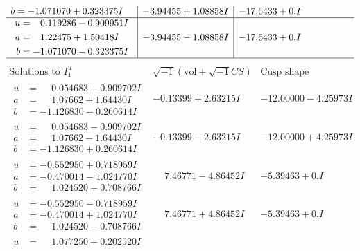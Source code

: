\documentclass[1p]{elsarticle_modified}
\theoremstyle{definition}
\newcommand{\I}{\sqrt{-1}}
\begin{document}
$$\begin{array}{c|c|c}
\begin{aligned}
b &= -1.071070 + 0.323375 I\end{aligned}
 & -3.94455 + 1.08858 I & -17.6433 + 0. I\phantom{ +0.000000I} \\ \hline\begin{aligned}
u &= \phantom{-}0.119286 - 0.909951 I \\
a &= \phantom{-}1.22475 + 1.50418 I \\
b &= -1.071070 - 0.323375 I\end{aligned}
 & -3.94455 - 1.08858 I & -17.6433 + 0. I\phantom{ +0.000000I}\\
 \hline 
 \end{array}$$\newpage$$\begin{array}{c|c|c}  
\text{Solutions to }I^u_{1}& \I (\text{vol} + \sqrt{-1}CS) & \text{Cusp shape}\\
 \hline 
\begin{aligned}
u &= \phantom{-}0.054683 + 0.909702 I \\
a &= \phantom{-}1.07662 + 1.64430 I \\
b &= -1.126830 - 0.260614 I\end{aligned}
 & -0.13399 + 2.63215 I & -12.00000 - 4.25973 I \\ \hline\begin{aligned}
u &= \phantom{-}0.054683 - 0.909702 I \\
a &= \phantom{-}1.07662 - 1.64430 I \\
b &= -1.126830 + 0.260614 I\end{aligned}
 & -0.13399 - 2.63215 I & -12.00000 + 4.25973 I \\ \hline\begin{aligned}
u &= -0.552950 + 0.718959 I \\
a &= -0.470014 - 1.024770 I \\
b &= \phantom{-}1.024520 + 0.708766 I\end{aligned}
 & \phantom{-}7.46771 - 4.86452 I & -5.39463 + 0. I\phantom{ +0.000000I} \\ \hline\begin{aligned}
u &= -0.552950 - 0.718959 I \\
a &= -0.470014 + 1.024770 I \\
b &= \phantom{-}1.024520 - 0.708766 I\end{aligned}
 & \phantom{-}7.46771 + 4.86452 I & -5.39463 + 0. I\phantom{ +0.000000I} \\ \hline\begin{aligned}
u &= \phantom{-}1.077250 + 0.202520 I \\

\end{aligned}
\end{array}$$
\end{document}
